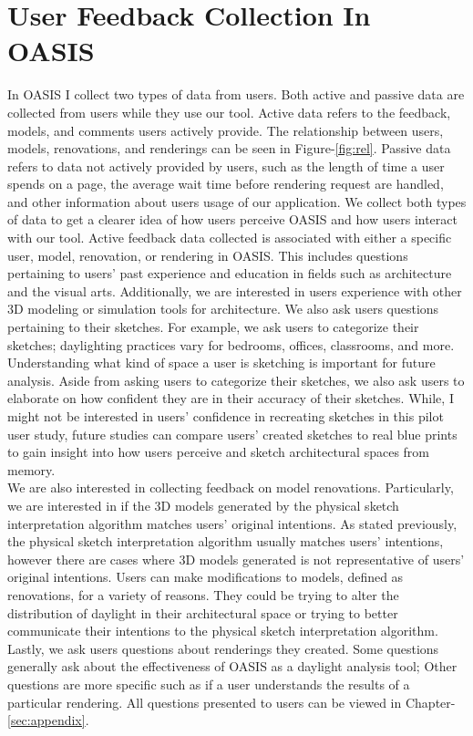 \section{User Feedback  Collection In OASIS}
In OASIS I collect two types of data from users. Both active and passive data are collected from users while they use our tool. Active data refers to the feedback, models, and comments users actively provide. The relationship between users, models, renovations, and renderings can be seen in Figure-\ref{fig:rel}. Passive data refers to data not actively provided by users, such as the length of time a user spends on a page, the average wait time before rendering request are handled, and other information about users usage of our application. We collect both types of data to get a clearer idea of how users perceive OASIS and how users interact with our tool. Active feedback data collected is associated with either a specific user, model, renovation, or rendering in OASIS. This includes questions pertaining to users' past experience and education in fields such as architecture and the visual arts. Additionally, we are interested in users experience with other 3D modeling or simulation tools for architecture. We also ask users questions pertaining to their sketches. For example, we ask users to categorize their sketches; daylighting practices vary for bedrooms, offices, classrooms, and more. Understanding what kind of space a user is sketching is important for future analysis.	Aside from asking users to categorize their sketches, we also ask users to elaborate on how confident they are in their accuracy of their sketches.  While, I might not be interested in users' confidence in recreating sketches in this pilot user study, future studies can compare users' created sketches to real blue prints to gain insight into how users perceive and sketch architectural spaces from memory.  \\

We are also interested in collecting feedback on model renovations. Particularly, we are interested in if the 3D models generated by the physical sketch interpretation algorithm matches users' original intentions. As stated previously, the physical sketch interpretation algorithm usually matches users' intentions, however there are cases where  3D models generated is not representative of users' original intentions. Users can make modifications to models, defined as renovations, for a variety of reasons. They could be trying to alter the distribution of daylight in their architectural space or trying to better communicate their intentions to the physical sketch interpretation algorithm. Lastly, we ask users questions about renderings they created. Some questions generally ask about the effectiveness of OASIS as a daylight analysis tool; Other questions are more specific such as if a user understands the results of a particular rendering. All questions presented to users can be viewed in Chapter-\ref{sec:appendix}.  \\

